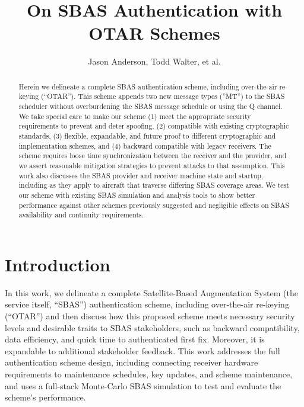 \documentclass[letterpaper,times]{IONconf/IONconf}
\title{On SBAS Authentication with OTAR Schemes}
\author{Jason Anderson, Todd Walter, et al.}
\begin{document}
\maketitle

\begin{abstract}
Herein we delineate a complete SBAS authentication scheme, including over-the-air re-keying (``OTAR'').
This scheme appends two new message types (''MT'') to the SBAS scheduler without overburdening the SBAS message schedule or using the Q channel.
We take special care to make our scheme (1) meet the appropriate security requirements to prevent and deter spoofing, (2) compatible with existing cryptographic standards, (3) flexible, expandable, and future proof to different cryptographic and implementation schemes, and (4) backward compatible with legacy receivers.
The scheme requires loose time synchronization between the receiver and the provider, and we assert reasonable mitigation strategies to prevent attacks to that assumption.
This work also discusses the SBAS provider and receiver machine state and startup, including as they apply to aircraft that traverse differing SBAS coverage areas.
We test our scheme with existing SBAS simulation and analysis tools to show better performance against other schemes previously suggested and negligible effects on SBAS availability and continuity requirements.
\end{abstract}

\section{Introduction}

In this work, we delineate a complete Satellite-Based Augmentation System (the service itself, ``SBAS'') authentication scheme, including over-the-air re-keying (``OTAR'') and then discuss how this proposed scheme meets necessary security levels and desirable traits to SBAS stakeholders, such as backward compatibility, data efficiency, and quick time to authenticated first fix.
Moreover, it is expandable to additional stakeholder feedback.
This work addresses the full authentication scheme design, including connecting receiver hardware requirements to maintenance schedules, key updates, and scheme maintenance, and uses a full-stack Monte-Carlo SBAS simulation to test and evaluate the scheme's performance.
\end{document}
